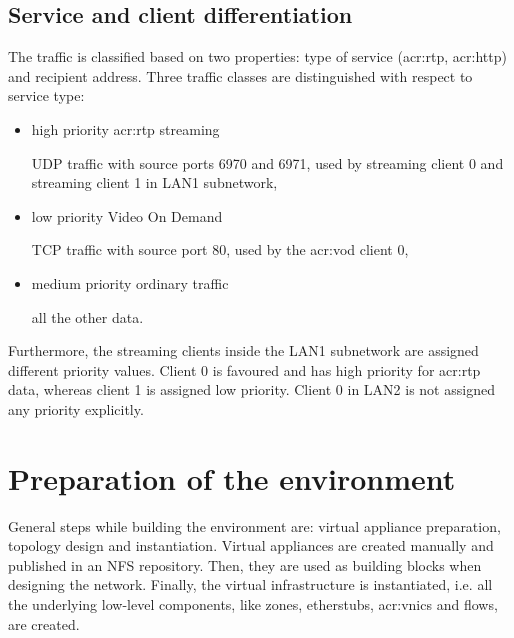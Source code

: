 \documentclass[11pt]{book}
\begin{document}
      \subsection{Service and client differentiation}
      \label{sub:uc:diff}

        The traffic is classified based on two properties: type of service (\gls{acr:rtp}, \gls{acr:http}) and recipient address. Three
        traffic classes are distinguished with respect to service type:

        \begin{itemize}

          \item high priority \gls{acr:rtp} streaming

                UDP traffic with source ports 6970 and 6971, used by streaming client 0
                and streaming client 1 in LAN1 subnetwork,

          \item low priority Video On Demand
          
                TCP traffic with source port 80, used by the \gls{acr:vod} client 0,

          \item medium priority ordinary traffic
          
                all the other data.

        \end{itemize}

        Furthermore, the streaming clients inside the LAN1 subnetwork are assigned different priority values. Client 0 is
        favoured and has high priority for \gls{acr:rtp} data, whereas client 1 is assigned low priority. Client 0 in LAN2
        is not assigned any priority explicitly.


    \section{Preparation of the environment}
    \label{sec:uc:prep}

      General steps while building the environment are: virtual appliance preparation, topology design and
      instantiation. Virtual appliances are created manually and published in an NFS repository. Then, they are used as
      building blocks when designing the network. Finally, the virtual infrastructure is instantiated, i.e. all the
      underlying low-level components, like zones, etherstubs, \gls{acr:vnic}s and flows, are created.
\end{document}
